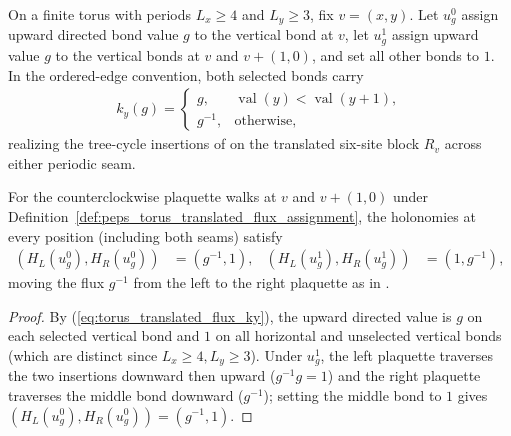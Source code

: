 \begin{definition}%
    \label{def:peps_torus_translated_flux_assignment}
    \leanok
    On a finite torus with periods $L_x\ge 4$ and $L_y\ge 3$, fix $v=(x,y)$.
    Let $u_g^0$ assign upward directed bond value $g$ to the vertical bond at $v$, let $u_g^1$ assign upward value $g$ to the vertical bonds at $v$ and $v+(1,0)$, and set all other bonds to $1$.
    In the ordered-edge convention, both selected bonds carry
    \begin{align}
        k_y(g)=
        \begin{cases}
            g,      & \operatorname{val}(y)<\operatorname{val}(y+1), \\
            g^{-1}, & \text{otherwise},
        \end{cases}
        \label{eq:torus_translated_flux_ky}
    \end{align}
    realizing the tree-cycle insertions of \cite[Theorem~6.16]{Schuch2010PEPS} on the translated six-site block $R_v$ across either periodic seam.
\end{definition}

\begin{lemma}%
    \label{thm:peps_torus_translated_flux_holonomy}
    \leanok
    For the counterclockwise plaquette walks at $v$ and $v+(1,0)$ under Definition~\ref{def:peps_torus_translated_flux_assignment}, the holonomies at every position (including both seams) satisfy
    \begin{align}
        (H_L(u_g^0),H_R(u_g^0)) & =(g^{-1},1),                                       &
        (H_L(u_g^1),H_R(u_g^1)) & =(1,g^{-1}), \label{eq:translated_flux_holonomies}
    \end{align}
    moving the flux $g^{-1}$ from the left to the right plaquette as in \cite[Theorem~6.16]{Schuch2010PEPS}.
\end{lemma}

\begin{proof}\leanok
    By (\ref{eq:torus_translated_flux_ky}), the upward directed value is $g$ on each selected vertical bond and $1$ on all horizontal and unselected vertical bonds (which are distinct since $L_x\ge 4,L_y\ge 3$).
    Under $u_g^1$, the left plaquette traverses the two insertions downward then upward ($g^{-1}g=1$) and the right plaquette traverses the middle bond downward ($g^{-1}$); setting the middle bond to $1$ gives $(H_L(u_g^0),H_R(u_g^0))=(g^{-1},1)$.
\end{proof}

